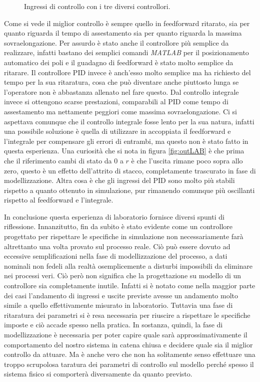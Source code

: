 		\begin{figure}[H]
			\centering
			 
			\caption{Ingressi di controllo con i tre diversi controllori.}
			\label{fig:inLAB}		
		\end{figure}		
		
		\noindent Come si vede il miglior controllo è sempre quello in feedforward ritarato, sia per quanto riguarda il tempo di assestamento sia per quanto riguarda la massima sovraelongazione. Per assurdo è stato anche il controllore più semplice da realizzare, infatti bastano dei semplici comandi \textit{MATLAB} per il posizionamento automatico dei poli e il guadagno di feedforward è stato molto semplice da ritarare. Il controllore PID invece è anch'esso molto semplice ma ha richiesto del tempo per la sua ritaratura, cosa che può diventare anche piuttosto lunga se l'operatore non è abbastanza allenato nel fare questo. Dal controllo integrale invece si ottengono scarse prestazioni, comparabili al PID come tempo di assestamento ma nettamente peggiori come massima sovraelongazione. Ci si aspettava comunque che il controllo integrale fosse lento per la sua natura, infatti una possibile soluzione è quella di utilizzare in accoppiata il feedforward e l'integrale per compensare gli errori di entrambi, ma questo non è stato fatto in questa esperienza. Una curiosità che si nota in figura \ref{fig:outLAB} è che prima che il riferimento cambi di stato da $0$ a $r$ è che l'uscita rimane poco sopra allo zero, questo è un effetto dell'attrito di stacco, completamente trascurato in fase di modellizzazione. Altra cosa è che gli ingressi del PID sono molto più stabili rispetto a quanto ottenuto in simulazione, pur rimanendo comunque più oscillanti rispetto al feedforward e l'integrale. \newline
		
		\noindent In conclusione questa esperienza di laboratorio fornisce diversi spunti di riflessione. Innanzitutto, fin da subito è stato evidente come un controllore progettato per rispettare le specifiche in simulazione non necessariamente farà altrettanto una volta provato sul processo reale. Ciò può essere dovuto ad eccessive semplificazioni nella fase di modellizzazione del processo, a dati nominali non fedeli alla realtà osemplicemente a disturbi impossibili da eliminare nei processi veri. Ciò però non significa che la progettazione su modello di un controllore sia completamente inutile. Infatti si è notato come nella maggior parte dei casi l’andamento di ingressi e uscite previste avesse un andamento molto simile a quello effettivamente misurato in laboratorio. Tuttavia una fase di ritaratura dei parametri si è resa necessaria per riuscire a rispettare le specifiche imposte e ciò accade spesso nella pratica. In sostanza, quindi, la fase di modellizzazione è necessaria per poter capire quale sarà approssimativamente il comportamento del nostro sistema in catena chiusa e decidere quale sia il miglior controllo da attuare. Ma è anche vero che non ha solitamente senso effettuare una troppo scrupolosa taratura dei parametri di controllo sul modello perché spesso il sistema fisico si comporterà diversamente da quanto previsto.  
		
		
		
		
		